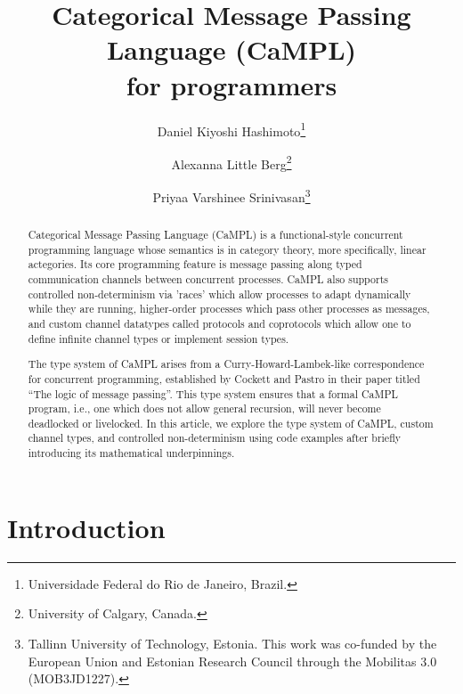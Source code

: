 \documentclass[11pt]{article}
\title{Categorical Message Passing Language (CaMPL) \\ for programmers}
\author{
    Daniel Kiyoshi Hashimoto\thanks{Universidade Federal do Rio de Janeiro, Brazil.} \and Alexanna {Little Berg}\thanks{University of Calgary, Canada.} \and Priyaa Varshinee Srinivasan\thanks{Tallinn University of Technology, Estonia. This work was co-funded by the European Union and Estonian Research Council through the Mobilitas 3.0
(MOB3JD1227).}}
\date{\vspace{-3em}}
\begin{document}
\maketitle

\begin{abstract} Categorical Message Passing Language (CaMPL) is a functional-style concurrent programming language whose semantics is in category theory, more specifically, linear actegories. Its core programming feature is message passing along typed communication channels between concurrent processes. CaMPL also supports controlled non-determinism via 'races' which allow processes to adapt dynamically while they are running, higher-order processes which pass other processes as messages, and custom channel datatypes called protocols and coprotocols which allow one to define infinite channel types or implement session types. 

The type system of CaMPL arises from a Curry-Howard-Lambek-like correspondence for concurrent programming, established by Cockett and Pastro in their paper titled ``The logic of message passing''.
This type system ensures that a formal CaMPL program, i.e., one which does not allow general recursion, will never become deadlocked or livelocked. In this article, we explore the type system of CaMPL, custom channel types, and controlled non-determinism using code examples after briefly introducing its mathematical underpinnings.
\end{abstract}

\section{Introduction}
\end{document}
